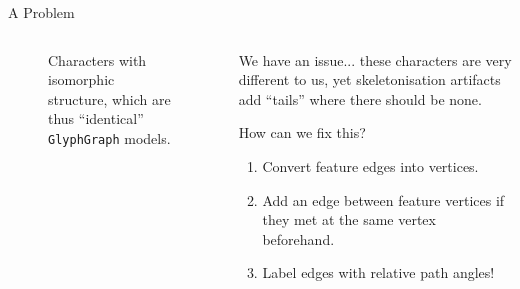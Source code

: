 \documentclass[10pt]{beamer}
\begin{document}
\begin{frame}{A Problem}
\begin{columns}
\begin{column}{0.6\linewidth}
\begin{figure}
{
			}
			
			\vspace{0.5em}
			
			\caption{Characters with isomorphic structure, which are thus ``identical'' \texttt{GlyphGraph} models.\label{fig:badisomorphism}}
		\end{figure}
	\end{column}
	\begin{column}{0.4\linewidth}
		\vspace{0.5em}
		
		We have an issue... these characters are very different to us, yet skeletonisation artifacts add ``tails'' where there should be none.
		
		\pause
		
		\begin{alertblock}{How can we fix this?}
			\begin{enumerate}[<alert@+(1)>]
				\item Convert feature edges into vertices.
				\item Add an edge between feature vertices if they met at the same vertex beforehand.
				\item Label edges with relative path angles!
			\end{enumerate}
		\end{alertblock}
	\end{column}
\end{columns}
\end{frame}
\end{document}
